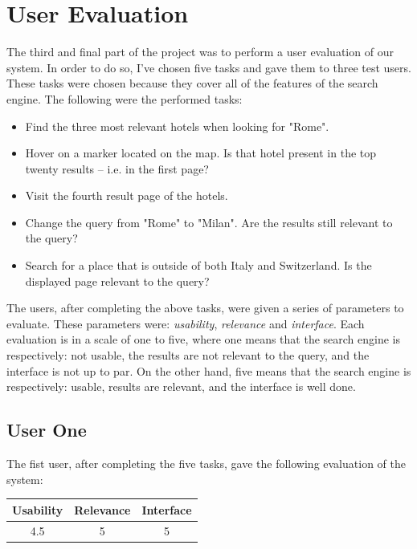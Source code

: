 \documentclass[unicode,11pt,a4paper,oneside,numbers=endperiod,openany]{scrartcl}
\begin{document}
\section{User Evaluation}
The third and final part of the project was to perform a user evaluation of our system. In order to do so, I've chosen five tasks and gave them to three test users. These tasks were chosen because they cover all of the features of the search engine. The following were the performed tasks:

\begin{itemize}
	\item Find the three most relevant hotels when looking for "Rome".
	\item Hover on a marker located on the map. Is that hotel present in the top twenty results -- i.e. in the first page?
	\item Visit the fourth result page of the hotels.
	\item Change the query from "Rome" to "Milan". Are the results still relevant to the query?
	\item Search for a place that is outside of both Italy and Switzerland. Is the displayed page relevant to the query?
\end{itemize}
The users, after completing the above tasks, were given a series of parameters to evaluate. These parameters were: \textit{usability}, \textit{relevance} and \textit{interface}. Each evaluation is in a scale of one to five, where one means that the search engine is respectively: not usable, the results are not relevant to the query, and the interface is not up to par. On the other hand, five means that the search engine is respectively: usable, results are relevant, and the interface is well done.

\subsection{User One}
The fist user, after completing the five tasks, gave the following evaluation of the system:

\begin{table}[H]
	\centering
	\begin{tabular}{|c|c|c|} \hline 
		\textbf{Usability} & \textbf{Relevance} & \textbf{Interface}  \\ \hline
		4.5 & 5 & 5 \\
		\hline
	\end{tabular}
\end{table}
\end{document}
